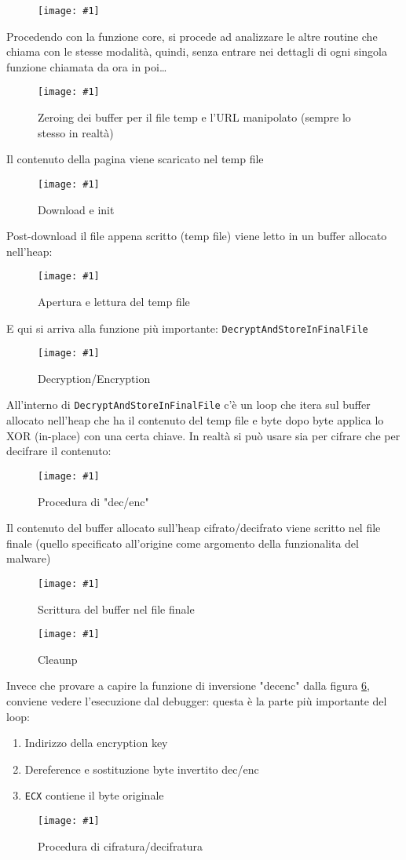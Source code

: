 \documentclass[
    a4paper, %
    11pt %
]{article}
\newcommand{\pic}[4]{\begin{figure}[H]
            \centering
            \texttt{[image: \#1]}
            \caption{#2}
            \label{fig:#1}
            \end{figure}}
\begin{document}
            \pic{adv_8_core_temp}{}{15cm}{2.5cm}

            Procedendo con la funzione core, si procede ad analizzare le altre routine che chiama 
            con le stesse modalità, quindi, senza entrare nei dettagli di ogni singola funzione chiamata
            da ora in poi\dots

            \pic{adv_8_core_bzero}{Zeroing dei buffer per il file temp e l'URL manipolato (sempre lo stesso in realtà)}{15cm}{4.5cm}

            Il contenuto della pagina viene scaricato nel temp file
            \pic{adv_8_core_dlnalloc}{Download e init}{13.5cm}{5cm}

            Post-download il file appena scritto (temp file) viene letto in un buffer allocato nell'heap:
            \pic{adv_8_core_fopen}{Apertura e lettura del temp file}{14cm}{3.5cm}

            E qui si arriva alla funzione più importante: \texttt{DecryptAndStoreInFinalFile}
            \pic{adv_8_core_decrypt}{Decryption/Encryption}{14cm}{4.5cm}

            All'interno di \texttt{DecryptAndStoreInFinalFile} c'è un loop che itera sul buffer allocato 
            nell'heap che ha il contenuto del temp file e byte dopo byte applica lo XOR (in-place) con una certa chiave. In
            realtà si può usare sia per cifrare che per decifrare il contenuto:
            \pic{adv_8_core_decrypt_fn}{Procedura di "dec/enc"}{18cm}{5cm}

            Il contenuto del buffer allocato sull'heap cifrato/decifrato viene scritto nel file finale (quello
            specificato all'origine come argomento della funzionalita del malware)
            \pic{adv_8_core_decrypt_finalwrite}{Scrittura del buffer nel file finale}{14.5cm}{4cm}

            \pic{adv_8_core_decrypt_cleanup}{Cleaunp}{15.5cm}{3cm}

            Invece che provare a capire la funzione di inversione "decenc" dalla figura 
            \ref{fig:adv_8_core_decrypt_fn}, conviene vedere l'esecuzione dal debugger: questa
            è la parte più importante del loop:
            \begin{enumerate}
                \item Indirizzo della encryption key
                \item Dereference e sostituzione byte invertito dec/enc
                \item \texttt{ECX} contiene il byte originale
            \end{enumerate}
            \pic{adv_8_core_decrypt_dbg_main}{Procedura di cifratura/decifratura}{12cm}{5cm}
\end{document}
